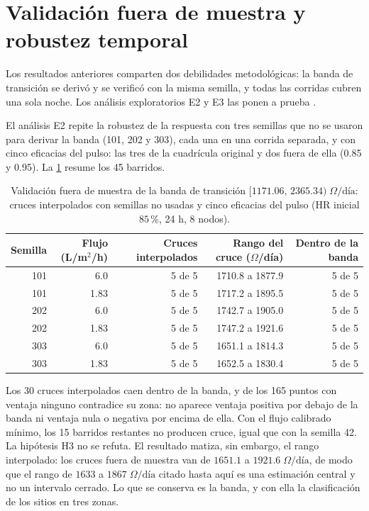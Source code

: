 \section{Validaci\'on fuera de muestra y robustez temporal}
\label{sec:validacion}
Los resultados anteriores comparten dos debilidades metodol\'ogicas: la banda de transici\'on se deriv\'o y se verific\'o con la misma semilla, y todas las corridas cubren una sola noche. Los an\'alisis exploratorios E2 y E3 las ponen a prueba \parencite[doc.~04, \S~8.13]{axioma2026engine}.

El an\'alisis E2 repite la robustez de la respuesta con tres semillas que no se usaron para derivar la banda (101, 202 y 303), cada una en una corrida separada, y con cinco eficacias del pulso: las tres de la cuadr\'icula original y dos fuera de ella (0.85 y 0.95). La \cref{tab:fuera_muestra} resume los 45 barridos.

\begin{table}[htbp]
\centering
\footnotesize
\caption{Validaci\'on fuera de muestra de la banda de transici\'on $[1171.06,\,2365.34)\;\Omega\text{/d\'ia}$: cruces interpolados con semillas no usadas y cinco eficacias del pulso (HR inicial $85\,\%$, 24 h, 8 nodos).}
\label{tab:fuera_muestra}
\begin{tabular*}{\textwidth}{@{\extracolsep{\fill}}rrrrr@{}}
\toprule
\textbf{Semilla} & \textbf{Flujo (L/m$^2$/h)} & \textbf{Cruces interpolados} & \textbf{Rango del cruce ($\Omega$/d\'ia)} & \textbf{Dentro de la banda} \\
\midrule
101 & 6.0 & 5 de 5 & 1710.8 a 1877.9 & 5 de 5 \\
101 & 1.83 & 5 de 5 & 1717.2 a 1895.5 & 5 de 5 \\
202 & 6.0 & 5 de 5 & 1742.7 a 1905.0 & 5 de 5 \\
202 & 1.83 & 5 de 5 & 1747.2 a 1921.6 & 5 de 5 \\
303 & 6.0 & 5 de 5 & 1651.1 a 1814.3 & 5 de 5 \\
303 & 1.83 & 5 de 5 & 1652.5 a 1830.4 & 5 de 5 \\
\bottomrule
\end{tabular*}
\end{table}

Los 30 cruces interpolados caen dentro de la banda, y de los 165 puntos con ventaja ninguno contradice su zona: no aparece ventaja positiva por debajo de la banda ni ventaja nula o negativa por encima de ella. Con el flujo calibrado m\'inimo, los 15 barridos restantes no producen cruce, igual que con la semilla 42. La hip\'otesis H3 no se refuta. El resultado matiza, sin embargo, el rango interpolado: los cruces fuera de muestra van de $1651.1$ a $1921.6\;\Omega\text{/d\'ia}$, de modo que el rango de $1633$ a $1867\;\Omega\text{/d\'ia}$ citado hasta aqu\'i es una estimaci\'on central y no un intervalo cerrado. Lo que se conserva es la banda, y con ella la clasificaci\'on de los sitios en tres zonas.


